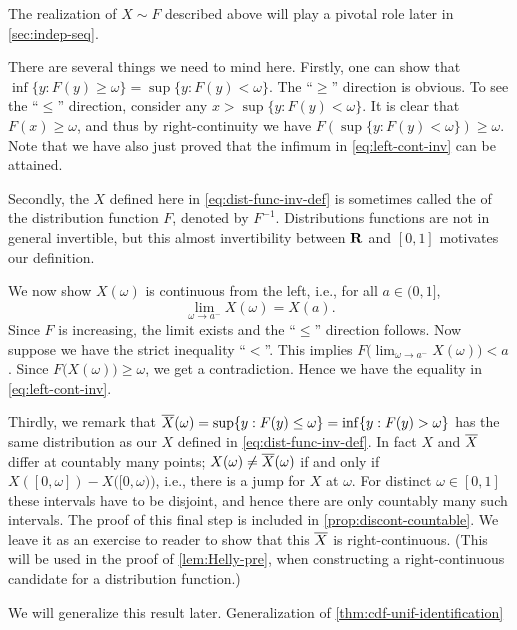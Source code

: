 The realization of $X\sim F$ described above will play a pivotal role later in \cref{sec:indep-seq}.

There are several things we need to mind here. Firstly, one can show that $\inf\{y : F(y) \geq \omega\} = \sup\{y : F(y) < \omega\}$. The ``$\geq$'' direction is obvious. To see the ``$\leq$'' direction, consider any $x > \sup\{y : F(y) < \omega\}$. It is clear that $F(x) \geq \omega$, and thus by right-continuity we have $F(\sup\{y : F(y) < \omega\})\geq \omega$. Note that we have also just proved that the infimum in \eqref{eq:left-cont-inv} can be attained.    

Secondly, the $X$ defined here in \eqref{eq:dist-func-inv-def} is sometimes called the  of the distribution function $F$, denoted by $F^{-1}$. Distributions functions are not in general invertible, but this almost invertibility between $\mathbf{R}$ and $[0,1]$ motivates our definition.

We now show $X(\omega)$ is continuous from the left, i.e., for all $a \in (0,1]$, \begin{equation}
    \lim_{\omega \to a^-} X(\omega) = X(a) \label{eq:left-cont-inv}.
\end{equation} Since $F$ is increasing, the limit exists and the ``$\leq$'' direction follows. Now suppose we have the strict inequality ``$<$''. This implies $F\bigl(\lim_{\omega \to a^-} X(\omega)\bigr) < a$. Since $F\bigl(X(\omega)\bigr) \geq \omega$, we get a contradiction. Hence we have the equality in \eqref{eq:left-cont-inv}.

Thirdly, we remark that $\overline{X}(\omega) = \sup\{y:F(y)\leq \omega\} = \inf\{y:F(y) > \omega\}$ has the same distribution as our $X$ defined in \eqref{eq:dist-func-inv-def}. In fact $X$ and $\overline{X}$ differ at countably many points; $X(\omega) \neq \overline{X}(\omega)$ if and only if $X([0,\omega]) - X\bigl([0,\omega)\bigr)$, i.e., there is a jump for $X$ at $\omega$. For distinct $\omega\in [0,1]$ these intervals have to be disjoint, and hence there are only countably many such intervals. The proof of this final step is included in \cref{prop:discont-countable}. We leave it as an exercise to reader to show that this $\overline{X}$ is right-continuous. (This will be used in the proof of \cref{lem:Helly-pre}, when constructing a right-continuous candidate for a distribution function.)

We will generalize this result later. Generalization of \cref{thm:cdf-unif-identification}
\begin{thm}
    
\end{thm}

